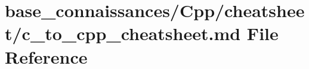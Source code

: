 \hypertarget{base__connaissances_2Cpp_2cheatsheet_2c__to__cpp__cheatsheet_8md}{}\section{base\+\_\+connaissances/\+Cpp/cheatsheet/c\+\_\+to\+\_\+cpp\+\_\+cheatsheet.md File Reference}
\label{base__connaissances_2Cpp_2cheatsheet_2c__to__cpp__cheatsheet_8md}
